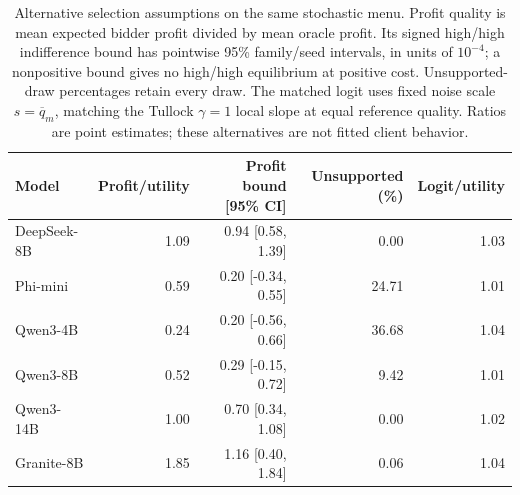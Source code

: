 \begin{table}[htbp]
\centering\small
\caption{Alternative selection assumptions on the same stochastic menu. Profit quality is mean expected bidder profit divided by mean oracle profit. Its signed high/high indifference bound has pointwise 95\% family/seed intervals, in units of $10^{-4}$; a nonpositive bound gives no high/high equilibrium at positive cost. Unsupported-draw percentages retain every draw. The matched logit uses fixed noise scale $s=\overline q_m$, matching the Tullock $\gamma=1$ local slope at equal reference quality. Ratios are point estimates; these alternatives are not fitted client behavior.}
\label{tab:selectionmappings}
\setlength{\tabcolsep}{3.5pt}
\begin{tabular}{lrrrr}
\toprule
Model & Profit/utility & Profit bound [95\% CI] & Unsupported (\%) & Logit/utility \\
\midrule
DeepSeek-8B & 1.09 & 0.94 [0.58, 1.39] & 0.00 & 1.03 \\
Phi-mini & 0.59 & 0.20 [-0.34, 0.55] & 24.71 & 1.01 \\
Qwen3-4B & 0.24 & 0.20 [-0.56, 0.66] & 36.68 & 1.04 \\
Qwen3-8B & 0.52 & 0.29 [-0.15, 0.72] & 9.42 & 1.01 \\
Qwen3-14B & 1.00 & 0.70 [0.34, 1.08] & 0.00 & 1.02 \\
Granite-8B & 1.85 & 1.16 [0.40, 1.84] & 0.06 & 1.04 \\
\bottomrule
\end{tabular}
\end{table}
